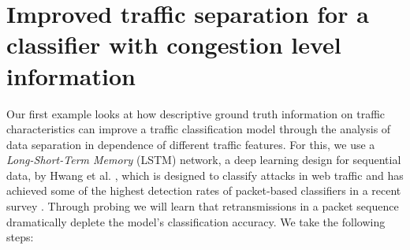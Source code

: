 \documentclass[conference]{IEEEtran}
\begin{document}
\section{Improved traffic separation for a classifier with congestion level information}\label{Sec:Improvedtrafficsep}


Our first example looks at how descriptive ground truth information on traffic characteristics can improve a traffic classification model through the analysis of data separation in dependence of different traffic features. For this, we use a \textit{Long-Short-Term Memory} (LSTM) network, a deep learning design for sequential data, by Hwang et al. \cite{hwang2019lstm}, which is designed to classify attacks in web traffic and has achieved some of the highest detection rates of packet-based classifiers in a recent survey \cite{tahaei2020rise}. Through probing we will learn that retransmissions in a packet sequence dramatically deplete the model's classification accuracy. We take the following steps:


\end{document}
